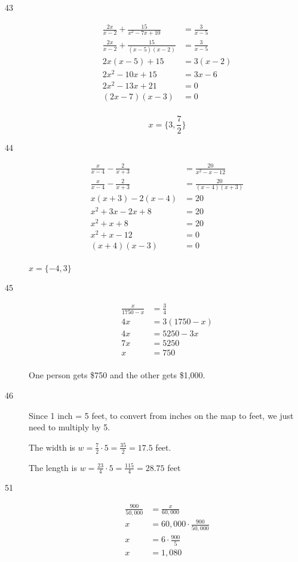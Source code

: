 \documentclass[fleqn,addpoints]{exam}
\begin{document}
\begin{description}
\item[43]
\begin{align*}
  \frac{2x}{x-2} + \frac{15}{x^2-7x+10} &= \frac{3}{x-5} \\
  \frac{2x}{x-2} + \frac{15}{(x-5)(x-2)} &= \frac{3}{x-5} \\
  2x(x-5) + 15 &= 3(x-2) \\
  2x^2-10x + 15 &= 3x-6 \\
  2x^2-13x + 21 &= 0 \\
  (2x - 7)(x - 3) &= 0 \\
\end{align*}

\[ x = \{ 3, \frac{7}{2} \} \]

\item[44]
\begin{align*}
  \frac{x}{x-4} - \frac{2}{x+3} &= \frac{20}{x^2-x-12} \\
  \frac{x}{x-4} - \frac{2}{x+3} &= \frac{20}{(x-4)(x+3)} \\
  x(x+3) - 2(x-4) &= 20 \\
  x^2+3x - 2x + 8 &= 20 \\
  x^2 +x + 8 &= 20 \\
  x^2 +x - 12 &= 0 \\
  (x+4)(x-3) &= 0 \\
\end{align*}

\( x = \{-4, 3\} \)

\item[45]
\begin{align*}
  \frac{x}{1750 - x} &= \frac{3}{4} \\
  4x &= 3(1750 - x) \\
  4x &= 5250 - 3x \\
  7x &= 5250 \\
  x  &= 750 \\
\end{align*}

One person gets \$750 and the other gets \$1,000.

\item[46]

Since 1 inch = 5 feet, to convert from inches on the map to feet, we just need to multiply by 5.

The width is $\displaystyle w = \frac{7}{2} \cdot 5 = \frac{35}{2} = 17.5$ feet.

The length is $\displaystyle w = \frac{23}{4} \cdot 5 = \frac{115}{4} = 28.75$ feet

\item[51]
\begin{align*}
  \frac{900}{50,000} &= \frac{x}{60,000} \\
  x &= 60,000 \cdot \frac{900}{50,000} \\
  x &= 6 \cdot \frac{900}{5} \\
  x &= 1,080 \\
\end{align*}


\end{description}
\end{document}
